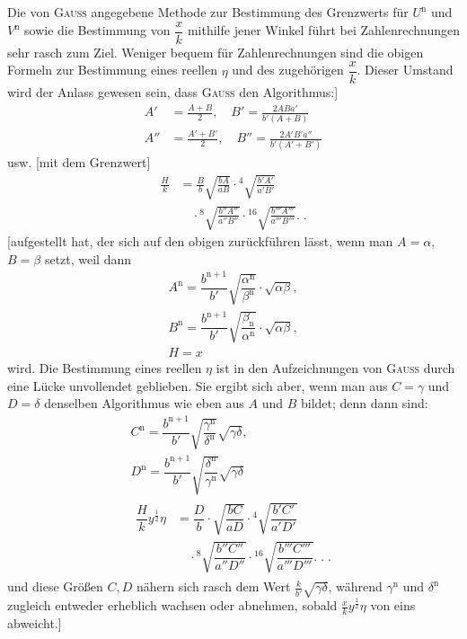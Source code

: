 Die von \textsc{Gauss} angegebene Methode zur Bestimmung des Grenzwerts für
$U^{\mathrm n}$ und $V^{\mathrm n}$ sowie die Bestimmung von $\dfrac xk$ mithilfe jener Winkel führt bei Zahlenrechnungen sehr rasch zum Ziel. Weniger bequem für Zahlenrechnungen sind die obigen Formeln zur Bestimmung eines reellen $\eta$ und des zugehörigen $\dfrac xk$. Dieser Umstand wird der Anlass gewesen sein, dass \textsc{Gauss} den Algorithmus:]
\[
\begin{aligned}
A'&=\frac{A+B}{2},\quad B'=\frac{2ABa'}{b'(A+B)}\\
A''&=\frac{A'+B'}{2},\quad B''=\frac{2A'B'a''}{b'(A'+B')}
\end{aligned}
\]
usw. [mit dem Grenzwert]
\[
\begin{aligned}\frac Hk&=\frac Bb\surd{\frac{bA}{aB}}
\cdot{}^{4}\!\surd{\frac{b'A'}{a'B'}}
\\&\quad\cdot{}^{8}\!\surd{\frac{b''A''}{a''B''}}
\cdot{}^{16}\!\surd{\frac{b'''A'''}{a'''B'''}}.\;.\end{aligned}
\]
[aufgestellt hat, der sich auf den obigen zurückführen lässt, wenn man
$A=\alpha$, $B=\beta$ setzt, weil dann
\[
\begin{gathered}A^{\mathrm n}=\dfrac{b^{\mathrm n+1}}{b'}\surd{\dfrac{\alpha^{\mathrm n}}{\beta^{\mathrm n}}}\cdot\surd{\alpha\beta},\\[9pt]
B^{\mathrm n}=\dfrac{b^{\mathrm n+1}}{b'}\surd{\dfrac{\beta_{\mathrm n}}{\alpha^{\mathrm n}}}\cdot\surd{\alpha\beta},\\[9pt] H=x\end{gathered}
\]
wird. Die Bestimmung eines reellen $\eta$ ist in den Aufzeichnungen von \textsc{Gauss} durch eine Lücke unvollendet geblieben. Sie ergibt sich aber, wenn man aus $C=\gamma$ und $D=\delta$ denselben Algorithmus wie eben aus $A$ und $B$ bildet; denn dann sind:
\[
\begin{gathered}
C^{\mathrm n}=\dfrac{b^{\mathrm n+1}}{b'}\surd{\dfrac{\gamma^{\mathrm n}}{\delta^{\mathrm n}}}\surd{\gamma\delta},\\[7pt]
D^{\mathrm n}=\dfrac{b^{\mathrm n+1}}{b'}\surd{\dfrac{\delta^{\mathrm n}}{\gamma^{\mathrm n}}}\surd{\gamma\delta}\\
\begin{aligned}\dfrac{H}{k}y^{\frac12}\eta&=\dfrac{D}{b}\cdot\surd{\dfrac{bC}{aD}}\cdot
{}^{4}\!\surd{\dfrac{b'C'}{a'D'}}\\&\quad\cdot{}^{8}\!\surd{\dfrac{b''C''}{a''D''}}\cdot
{}^{16}\!\surd{\dfrac{b'''C'''}{a'''D'''}}.\;.\;.\end{aligned}\end{gathered}
\]
und diese Größen $C,\allowbreak D$ nähern sich rasch dem Wert $\frac{k}{b'}\surd{\gamma\delta}$, während $\gamma^{\mathrm n}$ und $\delta^{\mathrm n}$ zugleich entweder erheblich wachsen oder abnehmen, sobald $\frac{x}{k}y^{\frac12}\eta$ von eins abweicht.]

\clearpage
\endgroup
